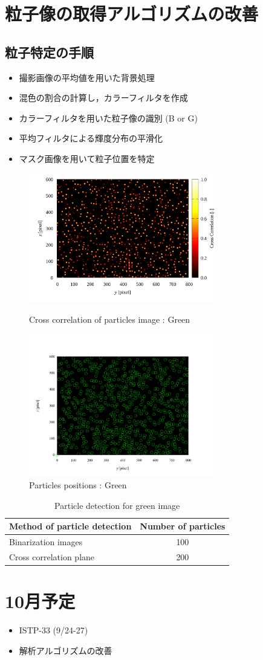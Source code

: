 \documentclass[twocolumn,a4j]{jsarticle}
\begin{document}
\section{粒子像の取得アルゴリズムの改善}
\subsection{粒子特定の手順}
\begin{itemize}
  \item 撮影画像の平均値を用いた背景処理
  \item 混色の割合の計算し，カラーフィルタを作成
  \item カラーフィルタを用いた粒子像の識別 (B or G)
  \item 平均フィルタによる輝度分布の平滑化
  \item マスク画像を用いて粒子位置を特定
\end{itemize}

\newpage
\begin{figure}[htbp]
  \includegraphics[keepaspectratio, width=82mm]{../images/cross_crr_particle.png}
  \caption{Cross correlation of particles image : Green}
  \includegraphics[keepaspectratio, width=82mm]{../images/particle_positions_green.png}
  \caption{Particles positions : Green}
\end{figure}

\begin{table}[hbtp]
  \centering
  \caption{Particle detection for green image}
  \begin{tabular}{l c}
    \hline
    Method of particle detection & Number of particles \\ \hline \hline
    Binarization images          & 100                 \\ \hline
    Cross correlation plane      & 200                 \\ \hline
  \end{tabular}
\end{table}

\section{10月予定}
\begin{itemize}
  \item ISTP-33 (9/24-27)
  \item 解析アルゴリズムの改善
\end{itemize}
\end{document}
